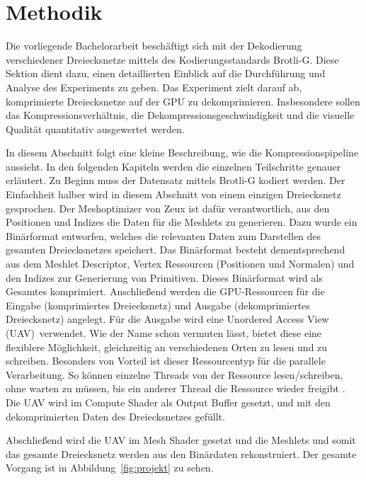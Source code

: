 \section{Methodik}
\label{sec:methodik}

Die vorliegende Bachelorarbeit beschäftigt sich mit der Dekodierung verschiedener Dreiecksnetze mittels des Kodierungsstandards Brotli-G.
Diese Sektion dient dazu, einen detaillierten Einblick auf die Durchführung und Analyse des Experiments zu geben.
Das Experiment zielt darauf ab, komprimierte Dreiecksnetze auf der GPU zu dekomprimieren.
Insbesondere sollen das Kompressionsverhältnis, die Dekompressionsgeschwindigkeit und die visuelle Qualität quantitativ ausgewertet werden. \newline

In diesem Abschnitt folgt eine kleine Beschreibung, wie die Kompressionspipeline aussieht.
In den folgenden Kapiteln werden die einzelnen Teilschritte genauer erläutert. \newline
Zu Beginn muss der Datensatz mittels Brotli-G kodiert werden.
Der Einfachheit halber wird in diesem Abschnitt von einem einzigen Dreiecksnetz gesprochen.
Der Meshoptimizer von Zeux \cite{Zeux} ist dafür verantwortlich, aus den Positionen und Indizes die Daten für die Meshlets zu generieren.
Dazu wurde ein Binärformat entworfen, welches die relevanten Daten zum Darstellen des gesamten Dreiecksnetzes speichert.
Das Binärformat besteht dementsprechend aus dem Meshlet Descriptor, Vertex Ressourcen (Positionen und Normalen) und den Indizes zur Generierung von Primitiven. \newline
Dieses Binärformat wird als Gesamtes komprimiert.
Anschließend werden die GPU-Ressourcen für die Eingabe (komprimiertes Dreiecksnetz) und Ausgabe (dekomprimiertes Dreiecksnetz) angelegt. \newline
Für die Ausgabe wird eine \glqq Unordered Access View (UAV)\grqq\ verwendet.
Wie der Name schon vermuten lässt, bietet diese eine flexiblere Möglichkeit, gleichzeitig an verschiedenen Orten zu lesen und zu schreiben.
Besonders von Vorteil ist dieser Ressourcentyp für die parallele Verarbeitung.
So können einzelne Threads von der Ressource lesen/schreiben, ohne warten zu müssen, bis ein anderer Thread die Ressource wieder freigibt \cite{Microsoft2021}. \newline
Die UAV wird im Compute Shader als Output Buffer gesetzt, und mit den dekomprimierten Daten des Dreiecksnetzes gefüllt.

Abschließend wird die UAV im Mesh Shader gesetzt und die Meshlets und somit das gesamte Dreiecksnetz werden aus den Binärdaten rekonstruiert. \newline
Der gesamte Vorgang ist in Abbildung~\ref{fig:projekt} zu sehen.

